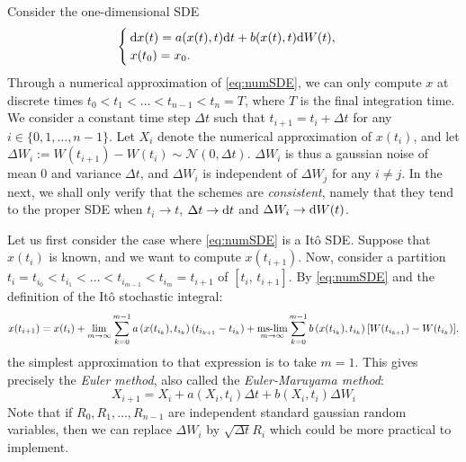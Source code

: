 Consider the one-dimensional SDE
\begin{equation} \label{eq:numSDE}
	\begin{cases}
		\rm dx(t) = a(x(t),t) \rm dt + b(x(t),t) \rm dW(t),\\
		x(t_0) = x_0. 
	\end{cases}
\end{equation}
Through a numerical approximation of \eqref{eq:numSDE}, we can only compute $x$ at discrete times $t_0 < t_1  < \dots < t_{n-1} < t_n = T$, where $T$ is the final integration time. We consider a constant time step $\Delta t$ such that $t_{i+1} = t_i + \Delta t$ for any $i \in \{0,1,\dots,n-1\}$. Let $X_i$ denote the numerical approximation of $x(t_i)$, and let $\Delta W_i := W(t_{i+1}) - W(t_i) \sim \mathcal{N}(0,\Delta t)$. $\Delta W_i$ is thus a gaussian noise of mean $0$ and variance $\Delta t$, and $\Delta W_i$ is independent of $\Delta W_j$ for any $i \neq j$. In the next, we shall only verify that the schemes are \textit{consistent}, namely that they tend to the proper SDE when $t_i \rightarrow t$, $\Delta t \rightarrow \rm dt$ and $\Delta W_i \rightarrow \rm dW(t)$.

Let us first consider the case where \eqref{eq:numSDE} is a Itô SDE. Suppose that $x(t_i)$ is known, and we want to compute $x(t_{i+1})$. Now, consider a partition $t_i = t_{i_0} < t_{i_1} < \dots < t_{i_{m-1}} < t_{i_m} = t_{i+1}$ of $[t_i,\, t_{i+1}]$. By \eqref{eq:numSDE} and the definition of the Itô stochastic integral: 
\begin{equation}
	x(t_{i+1}) = x(t_{i}) + \lim_{m\rightarrow\infty} \sum_{k=0}^{m-1} a\left(x(t_{i_k}),t_{i_k}\right)(t_{i_{k+1}} - t_{i_{k}}) + \mslim_{m\rightarrow\infty} \sum_{k=0}^{m-1} b\left(x(t_{i_{k}}),t_{i_k}\right)[W(t_{i_{k+1}}) - W(t_{i_{k}})].
\end{equation}
the simplest approximation to that expression is to take $m=1$. This gives precisely the \textit{Euler method}, also called the \textit{Euler-Maruyama method}:
\begin{equation}
	X_{i+1} = X_i + a(X_i,t_i) \Delta t + b(X_i,t_i) \Delta W_i
\end{equation}
Note that if $R_0,R_1,\dots,R_{n-1}$ are independent standard gaussian random variables, then we can replace $\Delta W_i$ by $\sqrt{\Delta t}R_i$ which could be more practical to implement.

